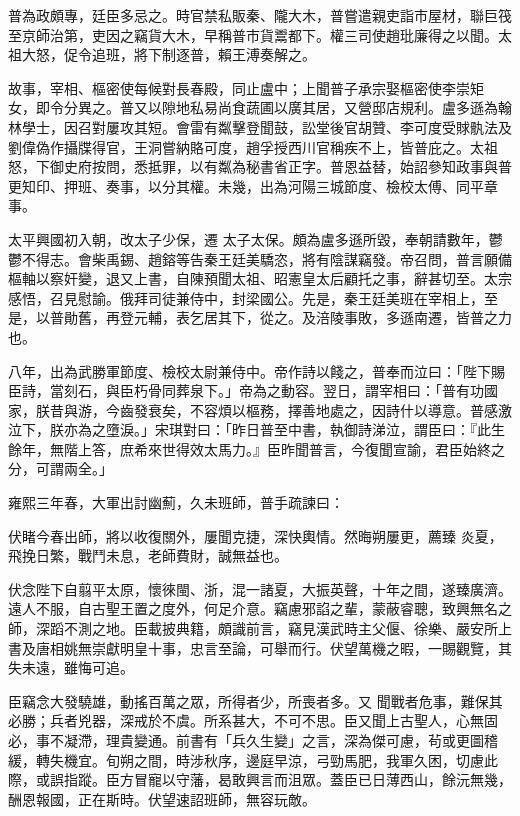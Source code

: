 \begin{pinyinscope}
 普為政頗專，廷臣多忌之。時官禁私販秦、隴大木，普嘗遣親吏詣市屋材，聯巨筏至京師治第，吏因之竊貨大木，早稱普市貨鬻都下。權三司使趙玭廉得之以聞。太祖大怒，促令追班，將下制逐普，賴王溥奏解之。



 故事，宰相、樞密使每候對長春殿，同止盧中；上聞普子承宗娶樞密使李崇矩
 女，即令分異之。普又以隙地私易尚食蔬圃以廣其居，又營邸店規利。盧多遜為翰林學士，因召對屢攻其短。會雷有粼擊登聞鼓，訟堂後官胡贊、李可度受賕骫法及劉偉偽作攝牒得官，王洞嘗納賂可度，趙孚授西川官稱疾不上，皆普庇之。太祖怒，下御史府按問，悉抵罪，以有粼為秘書省正字。普恩益替，始詔參知政事與普更知印、押班、奏事，以分其權。未幾，出為河陽三城節度、檢校太傅、同平章事。



 太平興國初入朝，改太子少保，遷
 太子太保。頗為盧多遜所毀，奉朝請數年，鬱鬱不得志。會柴禹錫、趙鎔等告秦王廷美驕恣，將有陰謀竊發。帝召問，普言願備樞軸以察奸變，退又上書，自陳預聞太祖、昭憲皇太后顧托之事，辭甚切至。太宗感悟，召見慰諭。俄拜司徒兼侍中，封梁國公。先是，秦王廷美班在宰相上，至是，以普勛舊，再登元輔，表乞居其下，從之。及涪陵事敗，多遜南遷，皆普之力也。



 八年，出為武勝軍節度、檢校太尉兼侍中。帝作詩以餞之，普奉而泣曰：「陛下賜
 臣詩，當刻石，與臣朽骨同葬泉下。」帝為之動容。翌日，謂宰相曰：「普有功國家，朕昔與游，今齒發衰矣，不容煩以樞務，擇善地處之，因詩什以導意。普感激泣下，朕亦為之墮淚。」宋琪對曰：「昨日普至中書，執御詩涕泣，謂臣曰：『此生餘年，無階上答，庶希來世得效太馬力。』臣昨聞普言，今復聞宣諭，君臣始終之分，可謂兩全。」



 雍熙三年春，大軍出討幽薊，久未班師，普手疏諫曰：



 伏睹今春出師，將以收復關外，屢聞克捷，深快輿情。然晦朔屢更，薦臻
 炎夏，飛挽日繁，戰鬥未息，老師費財，誠無益也。



 伏念陛下自翦平太原，懷徠閩、浙，混一諸夏，大振英聲，十年之間，遂臻廣濟。遠人不服，自古聖王置之度外，何足介意。竊慮邪諂之輩，蒙蔽睿聰，致興無名之師，深蹈不測之地。臣載披典籍，頗識前言，竊見漢武時主父偃、徐樂、嚴安所上書及唐相姚無崇獻明皇十事，忠言至論，可舉而行。伏望萬機之暇，一賜觀覽，其失未遠，雖悔可追。



 臣竊念大發驍雄，動搖百萬之眾，所得者少，所喪者多。又
 聞戰者危事，難保其必勝；兵者兇器，深戒於不虞。所系甚大，不可不思。臣又聞上古聖人，心無固必，事不凝滯，理貴變通。前書有「兵久生變」之言，深為傑可慮，茍或更圖稽緩，轉失機宜。旬朔之間，時涉秋序，邊庭早涼，弓勁馬肥，我軍久困，切慮此際，或誤指蹤。臣方冒寵以守藩，曷敢興言而沮眾。蓋臣已日薄西山，餘沅無幾，酬恩報國，正在斯時。伏望速詔班師，無容玩敵。




\end{pinyinscope}
